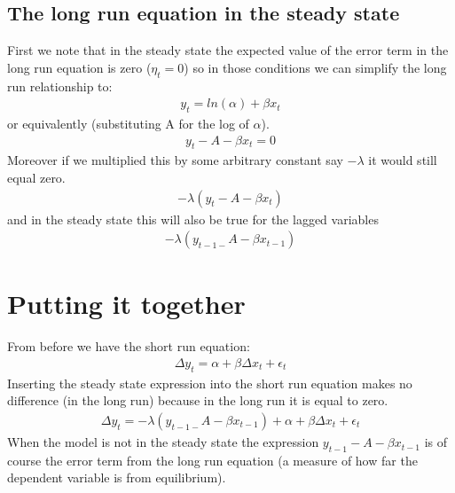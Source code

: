 \documentclass[letterpaper,10pt,english]{jupyterBook}
\begin{document}
\subsection{The long run equation in the steady state}
\label{\detokenize{content/05_WBModels/LoadingWBModel:the-long-run-equation-in-the-steady-state}}
\sphinxAtStartPar
First we note that in the steady state the expected value of the error term in the long run equation is zero (\(\eta_t=0 \)) so in those conditions we can simplify the long run relationship to:
\begin{equation*}
\begin{split}y_t=ln⁡(α)+\beta x_t\end{split}
\end{equation*}
\sphinxAtStartPar
or equivalently (substituting A for the log of \(\alpha\)).
\begin{equation*}
\begin{split}y_t-A-βx_t=0\end{split}
\end{equation*}
\sphinxAtStartPar
Moreover if we multiplied this by some arbitrary constant say \(-\lambda\) it would still equal zero.
\begin{equation*}
\begin{split}-\lambda(y_t -A-βx_t)\end{split}
\end{equation*}
\sphinxAtStartPar
and in the steady state this will also be true for the lagged variables
\begin{equation*}
\begin{split}-\lambda(y_{t-1-} A - βx_{t-1})\end{split}
\end{equation*}

\section{Putting it together}
\label{\detokenize{content/05_WBModels/LoadingWBModel:putting-it-together}}
\sphinxAtStartPar
From before we have the short run equation:
\begin{equation*}
\begin{split}\Delta y_t = \alpha + \beta \Delta x_t +\epsilon_t\end{split}
\end{equation*}
\sphinxAtStartPar
Inserting the steady state expression into the short run equation makes no difference (in the long run) because in the long run it is equal to zero.
\begin{equation*}
\begin{split}\Delta y_t = -\lambda(y_{t-1-}A-βx_{t-1})  + \alpha + \beta \Delta x_t +\epsilon_t\end{split}
\end{equation*}
\sphinxAtStartPar
When the model is not in the steady state the expression \(y_{t-1}-A-βx_{t-1}\) is of course the error term from the long run equation (a measure of how far the dependent variable is from equilibrium).
\end{document}
